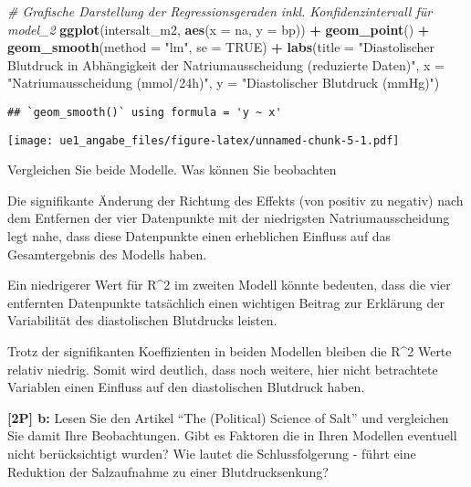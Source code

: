 \documentclass[
]{article}
\newenvironment{Shaded}{\begin{snugshade}}{\end{snugshade}}
\newcommand{\AttributeTok}[1]{\textcolor[rgb]{0.13,0.29,0.53}{#1}}
\newcommand{\CommentTok}[1]{\textcolor[rgb]{0.56,0.35,0.01}{\textit{#1}}}
\newcommand{\ConstantTok}[1]{\textcolor[rgb]{0.56,0.35,0.01}{#1}}
\newcommand{\FunctionTok}[1]{\textcolor[rgb]{0.13,0.29,0.53}{\textbf{#1}}}
\newcommand{\NormalTok}[1]{#1}
\newcommand{\SpecialCharTok}[1]{\textcolor[rgb]{0.81,0.36,0.00}{\textbf{#1}}}
\newcommand{\StringTok}[1]{\textcolor[rgb]{0.31,0.60,0.02}{#1}}
\begin{document}
\begin{Shaded}
\begin{Highlighting}[]
\CommentTok{\# Grafische Darstellung der Regressionsgeraden inkl. Konfidenzintervall für model\_2}
\FunctionTok{ggplot}\NormalTok{(intersalt\_m2, }\FunctionTok{aes}\NormalTok{(}\AttributeTok{x =}\NormalTok{ na, }\AttributeTok{y =}\NormalTok{ bp)) }\SpecialCharTok{+}
  \FunctionTok{geom\_point}\NormalTok{() }\SpecialCharTok{+}
  \FunctionTok{geom\_smooth}\NormalTok{(}\AttributeTok{method =} \StringTok{"lm"}\NormalTok{, }\AttributeTok{se =} \ConstantTok{TRUE}\NormalTok{) }\SpecialCharTok{+}
  \FunctionTok{labs}\NormalTok{(}\AttributeTok{title =} \StringTok{"Diastolischer Blutdruck in Abhängigkeit der Natriumausscheidung (reduzierte Daten)"}\NormalTok{,}
       \AttributeTok{x =} \StringTok{"Natriumausscheidung (mmol/24h)"}\NormalTok{,}
       \AttributeTok{y =} \StringTok{"Diastolischer Blutdruck (mmHg)"}\NormalTok{)}
\end{Highlighting}
\end{Shaded}

\begin{verbatim}
## `geom_smooth()` using formula = 'y ~ x'
\end{verbatim}

\texttt{[image: ue1\_angabe\_files/figure-latex/unnamed-chunk-5-1.pdf]}

Vergleichen Sie beide Modelle. Was können Sie beobachten

Die signifikante Änderung der Richtung des Effekts (von positiv zu
negativ) nach dem Entfernen der vier Datenpunkte mit der niedrigsten
Natriumausscheidung legt nahe, dass diese Datenpunkte einen erheblichen
Einfluss auf das Gesamtergebnis des Modells haben.

Ein niedrigerer Wert für R\^{}2 im zweiten Modell könnte bedeuten, dass
die vier entfernten Datenpunkte tatsächlich einen wichtigen Beitrag zur
Erklärung der Variabilität des diastolischen Blutdrucks leisten.

Trotz der signifikanten Koeffizienten in beiden Modellen bleiben die
R\^{}2 Werte relativ niedrig. Somit wird deutlich, dass noch weitere,
hier nicht betrachtete Variablen einen Einfluss auf den diastolischen
Blutdruck haben.

\textbf{{[}2P{]} b:} Lesen Sie den Artikel ``The (Political) Science of
Salt'' und vergleichen Sie damit Ihre Beobachtungen. Gibt es Faktoren
die in Ihren Modellen eventuell nicht berücksichtigt wurden? Wie lautet
die Schlussfolgerung - führt eine Reduktion der Salzaufnahme zu einer
Blutdrucksenkung?
\end{document}
